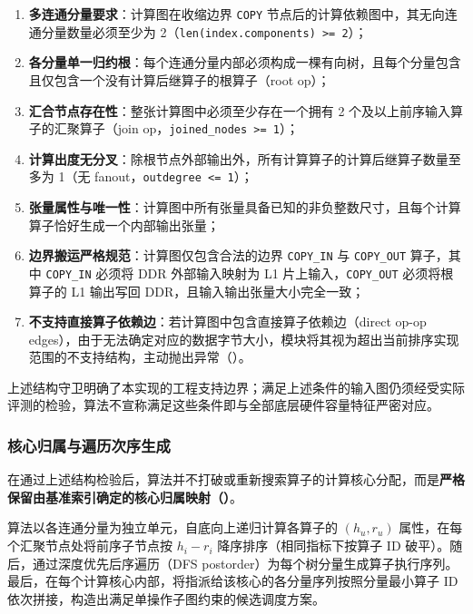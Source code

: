 \documentclass[anonymous,notoc]{gmcm2026}
\providecommand{\tightlist}{\setlength{\itemsep}{0pt}\setlength{\parskip}{0pt}}
\begin{document}
\begin{enumerate}
\def\labelenumi{\arabic{enumi}.}
\tightlist
\item
  \textbf{多连通分量要求}：计算图在收缩边界 \texttt{COPY} 节点后的计算依赖图中，其无向连通分量数量必须至少为 2（\texttt{len(index.components)\ \textgreater{}=\ 2}）；
\item
  \textbf{各分量单一归约根}：每个连通分量内部必须构成一棵有向树，且每个分量包含且仅包含一个没有计算后继算子的根算子（root op）；
\item
  \textbf{汇合节点存在性}：整张计算图中必须至少存在一个拥有 2 个及以上前序输入算子的汇聚算子（join op，\texttt{joined\_nodes\ \textgreater{}=\ 1}）；
\item
  \textbf{计算出度无分叉}：除根节点外部输出外，所有计算算子的计算后继算子数量至多为 1（无 fanout，\texttt{outdegree\ \textless{}=\ 1}）；
\item
  \textbf{张量属性与唯一性}：计算图中所有张量具备已知的非负整数尺寸，且每个计算算子恰好生成一个内部输出张量；
\item
  \textbf{边界搬运严格规范}：计算图仅包含合法的边界 \texttt{COPY\_IN} 与 \texttt{COPY\_OUT} 算子，其中 \texttt{COPY\_IN} 必须将 DDR 外部输入映射为 L1 片上输入，\texttt{COPY\_OUT} 必须将根算子的 L1 输出写回 DDR，且输入输出张量大小完全一致；
\item
  \textbf{不支持直接算子依赖边}：若计算图中包含直接算子依赖边（direct op-op edges），由于无法确定对应的数据字节大小，模块将其视为超出当前排序实现范围的不支持结构，主动抛出异常（\texttt{}）。
\end{enumerate}

上述结构守卫明确了本实现的工程支持边界；满足上述条件的输入图仍须经受实际评测的检验，算法不宣称满足这些条件即与全部底层硬件容量特征严密对应。

\subsubsection{核心归属与遍历次序生成}

在通过上述结构检验后，算法并不打破或重新搜索算子的计算核心分配，而是\textbf{严格保留由基准索引确定的核心归属映射（\texttt{}）}。

算法以各连通分量为独立单元，自底向上递归计算各算子的 \((h_u, r_u)\) 属性，在每个汇聚节点处将前序子节点按 \(h_i - r_i\) 降序排序（相同指标下按算子 ID 破平）。随后，通过深度优先后序遍历（DFS postorder）为每个树分量生成算子执行序列。最后，在每个计算核心内部，将指派给该核心的各分量序列按照分量最小算子 ID 依次拼接，构造出满足单操作子图约束的候选调度方案。
\end{document}
